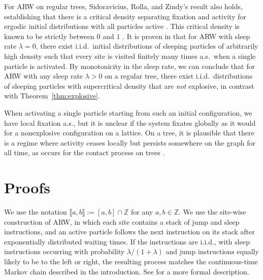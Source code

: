 \documentclass[ECP]{ejpecp} %
\begin{document}
\begin{remark}
\label{rem1.2}
For ARW on regular trees, Sidoravicius, Rolla, and Zindy's result also
holds, establishing that there is a critical density separating fixation
and activity for ergodic initial distributions with all particles active
\cite[Section~12.2]{rolla2020activated}. This critical density is known
to be strictly between $0$ and $1$
\cite[Theorem~1.6]{StaufferTaggi18}. It is proven in
\cite{JohnsonRolla19} that for ARW with sleep rate $\lambda =0$, there
exist i.i.d.\ initial distributions of sleeping particles of arbitrarily
high density such that every site is visited finitely many times a.s.\ when
a single particle is activated. By monotonicity in the sleep rate, we can
conclude that for ARW with any sleep rate $\lambda >0$ on a regular tree,
there exist i.i.d.\ distributions of sleeping particles with supercritical
density that are \emph{not} explosive, in contrast with Theorem~\ref{thm:explosive}.

When activating a single particle starting from such an initial configuration,
we have local fixation a.s., but it is unclear if the system fixates globally
as it would for a nonexplosive configuration on a lattice. On a tree, it
is plausible that there is a regime where activity ceases locally but persists
somewhere on the graph for all time, as occurs for the contact process
on trees \cite{pemantle1992contact}.
\end{remark}

\section{Proofs}
\label{sec2}

We use the notation $\mathopen{\llbracket }a,b \mathclose{\rrbracket } := [a,b] \cap \mathbb{Z}$ for any
$a,b \in \mathbb{Z}$. We use the site-wise construction of ARW, in which
each site contains a stack of jump and sleep instructions, and an active
particle follows the next instruction on its stack after exponentially
distributed waiting times. If the instructions are i.i.d., with sleep instructions
occurring with probability $\lambda /(1+\lambda )$ and jump instructions
equally likely to be to the left or right, the resulting process matches
the continuous-time Markov chain described in the introduction. See
\cite{rolla2020activated} for a more formal description.
\end{document}
